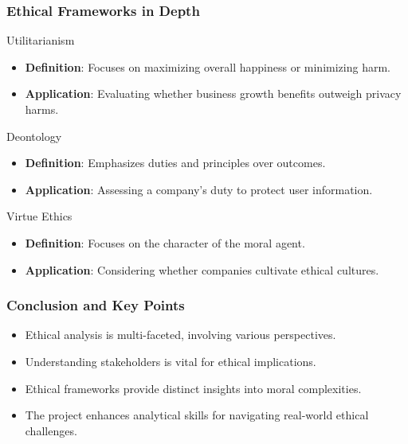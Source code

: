 \documentclass[aspectratio=169]{beamer}
\begin{document}
\begin{frame}[fragile]
    \frametitle{Ethical Frameworks in Depth}
    \begin{block}{Utilitarianism}
        \begin{itemize}
            \item \textbf{Definition}: Focuses on maximizing overall happiness or minimizing harm.
            \item \textbf{Application}: Evaluating whether business growth benefits outweigh privacy harms.
        \end{itemize}
    \end{block}
    
    \begin{block}{Deontology}
        \begin{itemize}
            \item \textbf{Definition}: Emphasizes duties and principles over outcomes.
            \item \textbf{Application}: Assessing a company's duty to protect user information.
        \end{itemize}
    \end{block}
    
    \begin{block}{Virtue Ethics}
        \begin{itemize}
            \item \textbf{Definition}: Focuses on the character of the moral agent.
            \item \textbf{Application}: Considering whether companies cultivate ethical cultures.
        \end{itemize}
    \end{block}
\end{frame}

\begin{frame}[fragile]
    \frametitle{Conclusion and Key Points}
    \begin{itemize}
        \item Ethical analysis is multi-faceted, involving various perspectives.
        \item Understanding stakeholders is vital for ethical implications.
        \item Ethical frameworks provide distinct insights into moral complexities.
        \item The project enhances analytical skills for navigating real-world ethical challenges.
    \end{itemize}
\end{frame}
\end{document}
